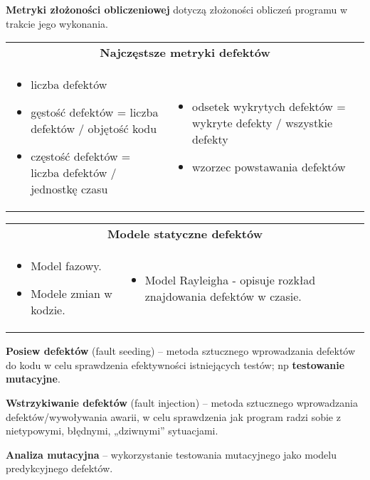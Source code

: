 \documentclass[../main.tex]{subfiles}
\begin{document}
    \textbf{Metryki złożoności obliczeniowej} dotyczą złożoności obliczeń programu w trakcie jego wykonania.

    \begin{table}[H]
        \begin{center}
            \begin{tabular}{p{8cm} p{8cm}}
                \multicolumn{2}{c}{\textbf{ Najczęstsze metryki defektów}}\\
                \begin{itemize}
                    \item liczba defektów
                    \item gęstość defektów = liczba defektów / objętość kodu
                    \item częstość defektów = liczba defektów / jednostkę czasu
                \end{itemize}
                &
                \begin{itemize}
                    \item odsetek wykrytych defektów = wykryte defekty / wszystkie defekty
                    \item wzorzec powstawania defektów
                \end{itemize}\\
            \end{tabular}
        \end{center}
    \end{table}

    \begin{table}[H]
        \begin{center}
            \begin{tabular}{p{8cm} p{8cm}}
                \multicolumn{2}{c}{\textbf{Modele statyczne defektów}}\\
                \begin{itemize}
                    \item Model fazowy.
                    \item Modele zmian w kodzie.
                \end{itemize}
                &
                \begin{itemize}
                    \item Model Rayleigha - opisuje rozkład znajdowania defektów w czasie.
                \end{itemize}
            \end{tabular}
        \end{center}
    \end{table}


    \textbf{Posiew defektów} (fault seeding) – metoda sztucznego wprowadzania defektów do kodu w
    celu sprawdzenia efektywności istniejących testów; np \textbf{testowanie mutacyjne}.

    \textbf{Wstrzykiwanie defektów} (fault injection) – metoda sztucznego wprowadzania defektów/wywoływania
    awarii, w celu sprawdzenia jak program radzi sobie z nietypowymi, błędnymi, „dziwnymi” sytuacjami.

    \textbf{Analiza mutacyjna} – wykorzystanie testowania mutacyjnego jako modelu predykcyjnego defektów.
\end{document}
